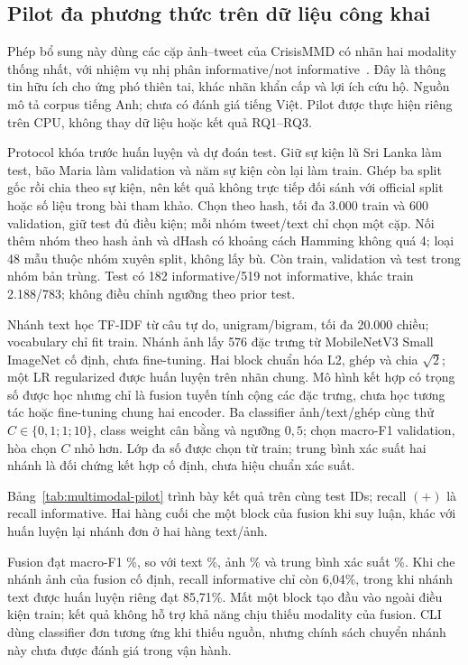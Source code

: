 \subsection{Pilot đa phương thức trên dữ liệu công khai}\label{sec:multimodal-pilot}
Phép bổ sung này dùng các cặp ảnh--tweet của CrisisMMD có nhãn hai modality thống nhất, với nhiệm vụ nhị phân informative/not informative~\cite{alam2018crisismmd,ofli2020multimodal}. Đây là thông tin hữu ích cho ứng phó thiên tai, khác nhãn khẩn cấp và lợi ích cứu hộ. Nguồn mô tả corpus tiếng Anh; chưa có đánh giá tiếng Việt. Pilot được thực hiện riêng trên CPU, không thay dữ liệu hoặc kết quả RQ1--RQ3.

Protocol khóa trước huấn luyện và dự đoán test. Giữ sự kiện lũ Sri Lanka làm test, bão Maria làm validation và năm sự kiện còn lại làm train. Ghép ba split gốc rồi chia theo sự kiện, nên kết quả không trực tiếp đối sánh với official split hoặc số liệu trong bài tham khảo. Chọn theo hash, tối đa 3.000 train và 600 validation, giữ test đủ điều kiện; mỗi nhóm tweet/text chỉ chọn một cặp. Nối thêm nhóm theo hash ảnh và dHash có khoảng cách Hamming không quá 4; loại 48 mẫu thuộc nhóm xuyên split, không lấy bù. Còn \MMTrainN{} train, \MMDevN{} validation và \MMTestN{} test trong \MMTestGroups{} nhóm bản trùng. Test có 182 informative/519 not informative, khác train 2.188/783; không điều chỉnh ngưỡng theo prior test.

Nhánh text học TF-IDF từ câu tự do, unigram/bigram, tối đa 20.000 chiều; vocabulary chỉ fit train. Nhánh ảnh lấy 576 đặc trưng từ MobileNetV3 Small ImageNet cố định, chưa fine-tuning. Hai block chuẩn hóa L2, ghép và chia $\sqrt{2}$; một LR regularized được huấn luyện trên nhãn chung. Mô hình kết hợp có trọng số được học nhưng chỉ là fusion tuyến tính cộng các đặc trưng, chưa học tương tác hoặc fine-tuning chung hai encoder. Ba classifier ảnh/text/ghép cùng thử $C\in\{0{,}1;1;10\}$, class weight cân bằng và ngưỡng $0{,}5$; chọn macro-F1 validation, hòa chọn $C$ nhỏ hơn. Lớp đa số được chọn từ train; trung bình xác suất hai nhánh là đối chứng kết hợp cố định, chưa hiệu chuẩn xác suất.

Bảng~\ref{tab:multimodal-pilot} trình bày kết quả trên cùng test IDs; recall $(+)$ là recall informative. Hai hàng cuối che một block của fusion khi suy luận, khác với huấn luyện lại nhánh đơn ở hai hàng text/ảnh.


Fusion đạt macro-F1 \MMFusionFOne\%, so với text \MMTextFOne\%, ảnh \MMImageFOne\% và trung bình xác suất \MMMeanFOne\%. Khi che nhánh ảnh của fusion cố định, recall informative chỉ còn 6,04\%, trong khi nhánh text được huấn luyện riêng đạt 85,71\%. Mất một block tạo đầu vào ngoài điều kiện train; kết quả không hỗ trợ khả năng chịu thiếu modality của fusion. CLI dùng classifier đơn tương ứng khi thiếu nguồn, nhưng chính sách chuyển nhánh này chưa được đánh giá trong vận hành.

